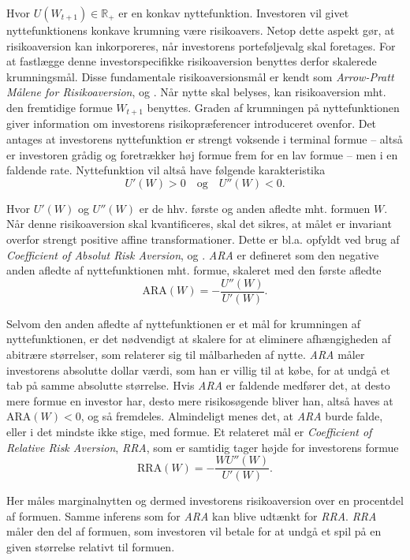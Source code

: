 \documentclass[
  a4paper,
  oneside]{memoir}
\begin{document}
Hvor \(U(W_{t+1})\in\mathbb{R}_+\) er en konkav nyttefunktion. Investoren vil givet nyttefunktionens konkave krumning være risikoavers. Netop dette aspekt gør, at risikoaversion kan inkorporeres, når investorens porteføljevalg skal foretages. For at fastlægge denne investorspecifikke risikoaversion benyttes derfor skalerede krumningsmål. Disse fundamentale risikoaversionsmål er kendt som \emph{Arrow-Pratt Målene for Risikoaversion}, \citep{Arrow1965} og \citep{Pratt1964}. Når nytte skal belyses, kan risikoaversion mht. den fremtidige formue \(W_{t+1}\) benyttes. Graden af krumningen på nyttefunktionen giver information om investorens risikopræferencer introduceret ovenfor. Det antages at investorens nyttefunktion er strengt voksende i terminal formue -- altså er investoren grådig og foretrækker høj formue frem for en lav formue -- men i en faldende rate. Nyttefunktion vil altså have følgende karakteristika
\[U'(W)>0\quad\text{og}\quad U''(W)<0.\]

Hvor \(U'(W)\) og \(U''(W)\) er de hhv. første og anden afledte mht. formuen \(W\). Når denne risikoaversion skal kvantificeres, skal det sikres, at målet er invariant overfor strengt positive affine transformationer. Dette er bl.a. opfyldt ved brug af \emph{Coefficient of Absolut Risk Aversion}, \citep{Arrow1965} og \citep{Pratt1964}. \emph{ARA} er defineret som den negative anden afledte af nyttefunktionen mht. formue, skaleret med den første afledte
\[\text{ARA}(W)=-\frac{U''(W)}{U'(W)}.\]

Selvom den anden afledte af nyttefunktionen er et mål for krumningen af nyttefunktionen, er det nødvendigt at skalere for at eliminere afhængigheden af abitrære størrelser, som relaterer sig til målbarheden af nytte. \emph{ARA} måler investorens absolutte dollar værdi, som han er villig til at købe, for at undgå et tab på samme absolutte størrelse. Hvis \emph{ARA} er faldende medfører det, at desto mere formue en investor har, desto mere risikosøgende bliver han, altså haves at \(\text{ARA}(W)<0\), og så fremdeles. Almindeligt menes det, at \emph{ARA} burde falde, eller i det mindste ikke stige, med formue. Et relateret mål er \emph{Coefficient of Relative Risk Aversion}, \emph{RRA}, som er samtidig tager højde for investorens formue
\[\text{RRA}(W)=-\frac{WU''(W)}{U'(W)}.\]

Her måles marginalnytten og dermed investorens risikoaversion over en procentdel af formuen. Samme inferens som for \emph{ARA} kan blive udtænkt for \emph{RRA}. \emph{RRA} måler den del af formuen, som investoren vil betale for at undgå et spil på en given størrelse relativt til formuen.
\end{document}

